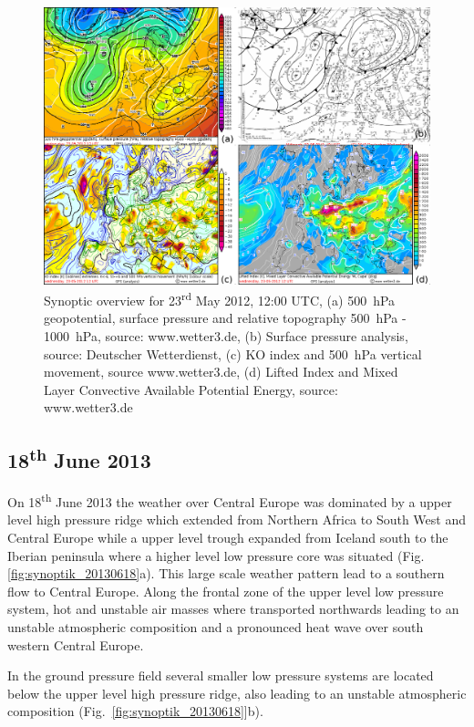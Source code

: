 \begin{figure}[htbp]
	\centering
	\includegraphics[width=0.8\linewidth]{Grafiken/Abbildungen/synoptik_20120523.png}
	\caption{Synoptic overview for 23\textsuperscript{rd} May 2012, 12:00 UTC, (a) \SI{500}{\hecto\pascal} geopotential, surface pressure and relative topography \SI{500}{\hecto\pascal} - \SI{1000}{\hecto\pascal}, source: www.wetter3.de, (b) Surface pressure analysis, source: Deutscher Wetterdienst, (c) KO index and \SI{500}{\hecto\pascal} vertical movement, source www.wetter3.de, (d) Lifted Index and Mixed Layer Convective Available Potential Energy, source: www.wetter3.de}
    \label{fig:synoptik_20120523}  
\end{figure}

\subsection{18\textsuperscript{th} June 2013}
On 18\textsuperscript{th} June 2013 the weather over Central Europe was dominated by a upper level high pressure ridge which extended from Northern Africa to South West and Central Europe while a upper level trough expanded from Iceland south to the Iberian peninsula where a higher level low pressure core was situated (Fig.~ \ref{fig:synoptik_20130618}a). This large scale weather pattern lead to a southern flow to Central Europe. Along the frontal zone of the upper level low pressure system, hot and unstable air masses where transported northwards leading to an unstable atmospheric composition and a pronounced heat wave over south western Central Europe.

In the ground pressure field several smaller low pressure systems are located below the upper level high pressure ridge, also leading to an unstable atmospheric composition (Fig.~\ref{fig:synoptik_20130618}]b). 

